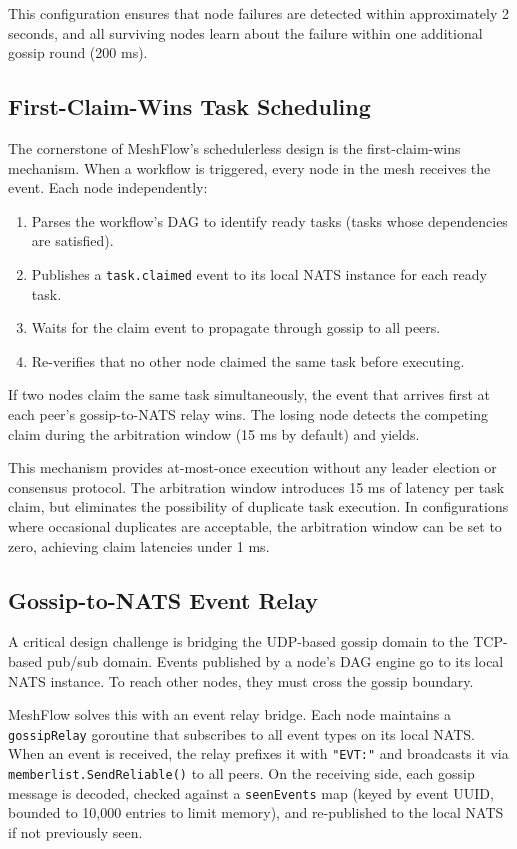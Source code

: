 This configuration ensures that node failures are detected within approximately 2 seconds, and all surviving nodes learn about the failure within one additional gossip round (200 ms).

\subsection{First-Claim-Wins Task Scheduling}

The cornerstone of MeshFlow's schedulerless design is the first-claim-wins mechanism. When a workflow is triggered, every node in the mesh receives the event. Each node independently:

\begin{enumerate}
\item Parses the workflow's DAG to identify ready tasks (tasks whose dependencies are satisfied).
\item Publishes a \texttt{task.claimed} event to its local NATS instance for each ready task.
\item Waits for the claim event to propagate through gossip to all peers.
\item Re-verifies that no other node claimed the same task before executing.
\end{enumerate}

If two nodes claim the same task simultaneously, the event that arrives first at each peer's gossip-to-NATS relay wins. The losing node detects the competing claim during the arbitration window (15 ms by default) and yields.

This mechanism provides at-most-once execution without any leader election or consensus protocol. The arbitration window introduces 15 ms of latency per task claim, but eliminates the possibility of duplicate task execution. In configurations where occasional duplicates are acceptable, the arbitration window can be set to zero, achieving claim latencies under 1 ms.

\subsection{Gossip-to-NATS Event Relay}

A critical design challenge is bridging the UDP-based gossip domain to the TCP-based pub/sub domain. Events published by a node's DAG engine go to its local NATS instance. To reach other nodes, they must cross the gossip boundary.

MeshFlow solves this with an event relay bridge. Each node maintains a \texttt{gossipRelay} goroutine that subscribes to all event types on its local NATS. When an event is received, the relay prefixes it with \texttt{"EVT:"} and broadcasts it via \texttt{memberlist.SendReliable()} to all peers. On the receiving side, each gossip message is decoded, checked against a \texttt{seenEvents} map (keyed by event UUID, bounded to 10,000 entries to limit memory), and re-published to the local NATS if not previously seen.

